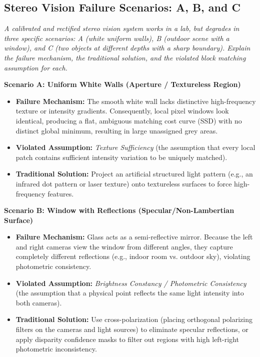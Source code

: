 \subsection[Question -- {\it Stereo Vision Failure Scenarios}]{}

\subsection{Stereo Vision Failure Scenarios: A, B, and C}
\textit{A calibrated and rectified stereo vision system works in a lab, but degrades in three specific scenarios: A (white uniform walls), B (outdoor scene with a window), and C (two objects at different depths with a sharp boundary). Explain the failure mechanism, the traditional solution, and the violated block matching assumption for each.}

\textbf{Scenario A: Uniform White Walls (Aperture / Textureless Region)}
\begin{itemize}
    \item \textbf{Failure Mechanism:} The smooth white wall lacks distinctive high-frequency texture or intensity gradients. Consequently, local pixel windows look identical, producing a flat, ambiguous matching cost curve (SSD) with no distinct global minimum, resulting in large unassigned grey areas.
    \item \textbf{Violated Assumption:} \textit{Texture Sufficiency} (the assumption that every local patch contains sufficient intensity variation to be uniquely matched).
    \item \textbf{Traditional Solution:} Project an artificial structured light pattern (e.g., an infrared dot pattern or laser texture) onto textureless surfaces to force high-frequency features.
\end{itemize}

\textbf{Scenario B: Window with Reflections (Specular/Non-Lambertian Surface)}
\begin{itemize}
    \item \textbf{Failure Mechanism:} Glass acts as a semi-reflective mirror. Because the left and right cameras view the window from different angles, they capture completely different reflections (e.g., indoor room vs. outdoor sky), violating photometric consistency.
    \item \textbf{Violated Assumption:} \textit{Brightness Constancy / Photometric Consistency} (the assumption that a physical point reflects the same light intensity into both cameras).
    \item \textbf{Traditional Solution:} Use cross-polarization (placing orthogonal polarizing filters on the cameras and light sources) to eliminate specular reflections, or apply disparity confidence masks to filter out regions with high left-right photometric inconsistency.
\end{itemize}

